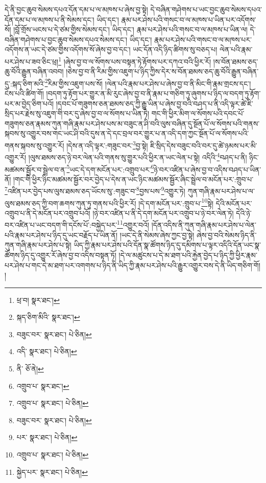 དེ་ནི་བྱང་ཆུབ་སེམས་དཔའ་དོན་དམ་པ་ལ་མཁས་པ་ཞེས་བྱ་སྟེ། དེ་བཞིན་གཤེགས་པ་ཡང་བྱང་ཆུབ་སེམས་དཔའ་དོན་དམ་པ་ལ་མཁས་པ་ནི་སེམས་དང་། ཡིད་དང་། རྣམ་པར་ཤེས་པའི་གསང་བ་ལ་མཁས་པ་ཡིན་པར་འདོགས་སོ། །བློ་གྲོས་ཡངས་པ་དེ་ཙམ་གྱིས་སེམས་དང་། ཡིད་དང་། རྣམ་པར་ཤེས་པའི་གསང་བ་ལ་མཁས་པ་ཡིན་ལ། དེ་བཞིན་གཤེགས་པ་བྱང་ཆུབ་སེམས་དཔའ་སེམས་དང་། ཡིད་དང་། རྣམ་པར་ཤེས་པའི་གསང་བ་ལ་མཁས་པར་འདོགས་ན་ཡང་དེ་ཙམ་གྱིས་འདོགས་སོ་ཞེས་བྱ་བ་དང་། ཡང་དོན་འདི་ཉིད་ཚིགས་སུ་བཅད་པ། ལེན་པའི་རྣམ་པར་ཤེས་པ་ཟབ་ཅིང་ཕྲ།\footnote{ཕྲ་བ།  སྣར་ཐང་། } །ཞེས་བྱ་བ་ལ་སོགས་པས་བསྟན་ཏེ་རྟོགས་པར་དཀའ་བའི་ཕྱིར་རོ། །ས་བོན་ཐམས་ཅད་ཆུ་བོའི་རྒྱུན་བཞིན་འབབ། །ཅེས་བྱ་བ་ནི་རིམ་གྱིས་འཇུག་པ་ཉིད་ཀྱིས་དེར་ས་བོན་ཐམས་ཅད་ཆུ་བོའི་རྒྱུན་བཞིན་དུ་:སྐད་ཅིག་མའི་\footnote{སྐད་ཅིག་མིའི་  སྣར་ཐང་། }རིམ་གྱིས་འཇུག་པས་སོ། །ལེན་པའི་རྣམ་པར་ཤེས་པ་ཞེས་བྱ་བ་ནི་མིང་གི་རྣམ་གྲངས་དང་། ངེས་པའི་ཚིག་གོ། །བདག་ཏུ་རྟོག་པར་གྱུར་ན་མི་རུང་ཞེས་བྱ་བ་ནི་རྣམ་པ་གཅིག་ཏུ་ཞུགས་པ་ཉིད་ལ་བདག་ཏུ་རྟོག་པར་མ་བྱེད་ཅིག་པའོ། །དབང་པོ་གཟུགས་ཅན་ཐམས་ཅད་ཀྱི་རྒྱུ་ཡིན་པ་ཞེས་བྱ་བའི་བཤད་པ་ནི་འདི་ལྟར་ཚེ་ཇི་སྲིད་པར་རྗེས་སུ་འཇུག་གི་བར་དུ་ཞེས་བྱ་བ་ལ་སོགས་པ་ཡིན་ཏེ། གང་གི་ཕྱིར་མིག་ལ་སོགས་པའི་དབང་པོ་གཟུགས་ཅན་རྣམས་ཀུན་གཞི་རྣམ་པར་ཤེས་པས་མ་བཟུང་ན་ཤི་བའི་ལུས་བཞིན་དུ་སྔོན་པོ་ལ་སོགས་པའི་གནས་སྐབས་སུ་འགྱུར་བས་གང་ཡང་ཤི་བའི་དུས་ན་དེ་དང་བྲལ་བར་གྱུར་པ་ན་འདི་དག་ཀྱང་སྔོན་པོ་ལ་སོགས་པའི་གནས་སྐབས་སུ་འགྱུར་རོ། །དེས་ན་འདི་ལྟར་:གཟུང་བར་\footnote{བཟུང་བར་  སྣར་ཐང་།  པེ་ཅིན། }བྱ་སྟེ། ཇི་སྲིད་དེས་བཟུང་བའི་བར་དུ་ཚེ་ཉམས་པར་མི་འགྱུར་རོ། །ལུས་ཐམས་ཅད་ཉེ་བར་ལེན་པའི་གནས་སུ་གྱུར་པའི་ཕྱིར་ན་ཡང་ལེན་པ་སྟེ། འདིའི་\footnote{འདི་  སྣར་ཐང་།  པེ་ཅིན། }བཤད་པ་ནི། ཉིང་མཚམས་སྦྱོར་བ་སྦྲེལ་བ་ན་\footnote{ནི་  ཅོ་ནེ། }ཡང་དེ་དག་མངོན་པར་:འགྲུབ་པར་\footnote{འགྲུབ་པ་  སྣར་ཐང་། }ཉེ་བར་འཛིན་པ་ཞེས་བྱ་བ་འདིས་བཤད་པ་ཡིན་ནོ། །གང་གི་ཕྱིར་ཉིང་མཚམས་སྦྱོར་བར་བྱེད་པ་དེས་ན་ཡང་ཉིང་མཚམས་སྦྱོར་ཞིང་སྦྲེལ་བ་མངོན་པར་:གྲུབ་པ་\footnote{འགྲུབ་པ་  སྣར་ཐང་།  པེ་ཅིན། }འཛིན་པར་བྱེད་པས་ལུས་ཐམས་ཅད་ཡོངས་སུ་:གཟུང་བ་\footnote{བཟུང་བར་  སྣར་ཐང་།  པེ་ཅིན། }བྱས་པས་\footnote{པར་  སྣར་ཐང་།  པེ་ཅིན། }འགྱུར་ཏེ། ཀུན་གཞི་རྣམ་པར་ཤེས་པ་ལ་ལུས་ཐམས་ཅད་ཀྱི་བག་ཆགས་ཀུན་ཏུ་གནས་པའི་ཕྱིར་རོ། །དེ་དག་མངོན་པར་:གྲུབ་པ་\footnote{འགྲུབ་པ་  སྣར་ཐང་།  པེ་ཅིན། }སྟེ། དེའི་མངོན་པར་འགྲུབ་པ་ནི་དེ་མངོན་པར་འགྲུབ་པའོ། །ཉེ་བར་འཛིན་པ་ནི་དེ་དག་མངོན་པར་འགྲུབ་པ་ཉེ་བར་ལེན་ཏེ། དེའི་ཉེ་བར་འཛིན་པ་ཡང་བདག་གི་དངོས་པོ་:བསྐྱེད་པར་\footnote{སྐྱེད་པར་  སྣར་ཐང་།  པེ་ཅིན། }འགྱུར་བའོ། །དོན་འདིས་ནི་ཀུན་གཞི་རྣམ་པར་ཤེས་པ་ལེན་པའི་རྣམ་པར་ཤེས་པ་ཉིད་དུ་ཡང་བརྗོད་པ་ཡིན་ནོ། །ཡང་དེ་ནི་སེམས་ཞེས་ཀྱང་བྱ་སྟེ། ཞེས་བྱ་བའི་སེམས་ཉིད་ནི་ཀུན་གཞི་རྣམ་པར་ཤེས་པ་སྟེ། ཡིད་ཀྱི་རྣམ་པར་ཤེས་པའི་དོན་སྣ་ཚོགས་ཉིད་དུ་དམིགས་པ་ལྟར་འདིའི་དོན་ཡང་སྣ་ཚོགས་ཉིད་དུ་འགྱུར་རོ་ཞེས་བྱ་བ་འདིས་བསྟན་ཏོ། །དེ་ལ་མཚུངས་པ་དེ་མ་ཐག་པའི་རྐྱེན་བྱེད་པ་ཉིད་ཀྱི་ཕྱིར་རྣམ་པར་ཤེས་པ་གང་དེ་མ་ཐག་པར་འགགས་པ་ཉིད་ནི་ཡིད་ཀྱི་རྣམ་པར་ཤེས་པའི་རྒྱུར་འགྱུར་བས་དེ་ནི་ཡིད་གཅིག་གོ། །
